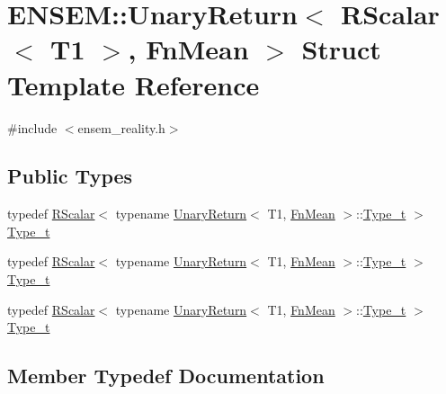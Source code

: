 \hypertarget{structENSEM_1_1UnaryReturn_3_01RScalar_3_01T1_01_4_00_01FnMean_01_4}{}\section{E\+N\+S\+EM\+:\+:Unary\+Return$<$ R\+Scalar$<$ T1 $>$, Fn\+Mean $>$ Struct Template Reference}
\label{structENSEM_1_1UnaryReturn_3_01RScalar_3_01T1_01_4_00_01FnMean_01_4}


{\ttfamily \#include $<$ensem\+\_\+reality.\+h$>$}

\subsection*{Public Types}
\begin{DoxyCompactItemize}
\item 
typedef \mbox{\hyperlink{classENSEM_1_1RScalar}{R\+Scalar}}$<$ typename \mbox{\hyperlink{structENSEM_1_1UnaryReturn}{Unary\+Return}}$<$ T1, \mbox{\hyperlink{structENSEM_1_1FnMean}{Fn\+Mean}} $>$\+::\mbox{\hyperlink{structENSEM_1_1UnaryReturn_3_01RScalar_3_01T1_01_4_00_01FnMean_01_4_a16f842b2df05b5909c08ddde22ca69f8}{Type\+\_\+t}} $>$ \mbox{\hyperlink{structENSEM_1_1UnaryReturn_3_01RScalar_3_01T1_01_4_00_01FnMean_01_4_a16f842b2df05b5909c08ddde22ca69f8}{Type\+\_\+t}}
\item 
typedef \mbox{\hyperlink{classENSEM_1_1RScalar}{R\+Scalar}}$<$ typename \mbox{\hyperlink{structENSEM_1_1UnaryReturn}{Unary\+Return}}$<$ T1, \mbox{\hyperlink{structENSEM_1_1FnMean}{Fn\+Mean}} $>$\+::\mbox{\hyperlink{structENSEM_1_1UnaryReturn_3_01RScalar_3_01T1_01_4_00_01FnMean_01_4_a16f842b2df05b5909c08ddde22ca69f8}{Type\+\_\+t}} $>$ \mbox{\hyperlink{structENSEM_1_1UnaryReturn_3_01RScalar_3_01T1_01_4_00_01FnMean_01_4_a16f842b2df05b5909c08ddde22ca69f8}{Type\+\_\+t}}
\item 
typedef \mbox{\hyperlink{classENSEM_1_1RScalar}{R\+Scalar}}$<$ typename \mbox{\hyperlink{structENSEM_1_1UnaryReturn}{Unary\+Return}}$<$ T1, \mbox{\hyperlink{structENSEM_1_1FnMean}{Fn\+Mean}} $>$\+::\mbox{\hyperlink{structENSEM_1_1UnaryReturn_3_01RScalar_3_01T1_01_4_00_01FnMean_01_4_a16f842b2df05b5909c08ddde22ca69f8}{Type\+\_\+t}} $>$ \mbox{\hyperlink{structENSEM_1_1UnaryReturn_3_01RScalar_3_01T1_01_4_00_01FnMean_01_4_a16f842b2df05b5909c08ddde22ca69f8}{Type\+\_\+t}}
\end{DoxyCompactItemize}


\subsection{Member Typedef Documentation}
\mbox{\label{structENSEM_1_1UnaryReturn_3_01RScalar_3_01T1_01_4_00_01FnMean_01_4_a16f842b2df05b5909c08ddde22ca69f8}} 

